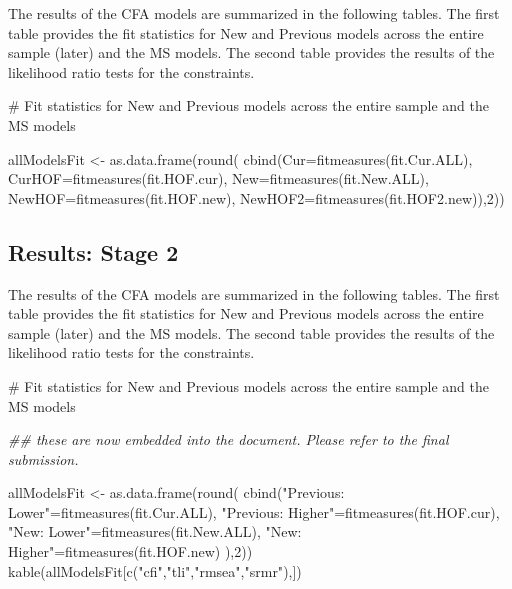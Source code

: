 \documentclass[
  letterpaper,
  DIV=11,
  numbers=noendperiod]{scrartcl}
\newenvironment{Shaded}{\begin{snugshade}}{\end{snugshade}}
\newcommand{\AttributeTok}[1]{\textcolor[rgb]{0.40,0.45,0.13}{#1}}
\newcommand{\CommentTok}[1]{\textcolor[rgb]{0.37,0.37,0.37}{#1}}
\newcommand{\DecValTok}[1]{\textcolor[rgb]{0.68,0.00,0.00}{#1}}
\newcommand{\DocumentationTok}[1]{\textcolor[rgb]{0.37,0.37,0.37}{\textit{#1}}}
\newcommand{\FunctionTok}[1]{\textcolor[rgb]{0.28,0.35,0.67}{#1}}
\newcommand{\NormalTok}[1]{\textcolor[rgb]{0.00,0.23,0.31}{#1}}
\newcommand{\OtherTok}[1]{\textcolor[rgb]{0.00,0.23,0.31}{#1}}
\newcommand{\StringTok}[1]{\textcolor[rgb]{0.13,0.47,0.30}{#1}}
\begin{document}
The results of the CFA models are summarized in the following tables.
The first table provides the fit statistics for New and Previous models
across the entire sample (later) and the MS models. The second table
provides the results of the likelihood ratio tests for the constraints.

\begin{Shaded}
\begin{Highlighting}[]
\CommentTok{\# Fit statistics for New and Previous models across the entire sample and the MS models}

\NormalTok{allModelsFit }\OtherTok{\textless{}{-}} \FunctionTok{as.data.frame}\NormalTok{(}\FunctionTok{round}\NormalTok{(}
  \FunctionTok{cbind}\NormalTok{(}\AttributeTok{Cur=}\FunctionTok{fitmeasures}\NormalTok{(fit.Cur.ALL),}
        \AttributeTok{CurHOF=}\FunctionTok{fitmeasures}\NormalTok{(fit.HOF.cur),}
        \AttributeTok{New=}\FunctionTok{fitmeasures}\NormalTok{(fit.New.ALL),}
        \AttributeTok{NewHOF=}\FunctionTok{fitmeasures}\NormalTok{(fit.HOF.new),}
        \AttributeTok{NewHOF2=}\FunctionTok{fitmeasures}\NormalTok{(fit.HOF2.new)),}\DecValTok{2}\NormalTok{))}
\end{Highlighting}
\end{Shaded}

\subsection{Results: Stage 2}\label{results-stage-2}

The results of the CFA models are summarized in the following tables.
The first table provides the fit statistics for New and Previous models
across the entire sample (later) and the MS models. The second table
provides the results of the likelihood ratio tests for the constraints.

\begin{Shaded}
\begin{Highlighting}[]
\CommentTok{\# Fit statistics for New and Previous models across the entire sample and the MS models}

\DocumentationTok{\#\# these are now embedded into the document.  Please refer to the final submission.}

\NormalTok{allModelsFit }\OtherTok{\textless{}{-}} \FunctionTok{as.data.frame}\NormalTok{(}\FunctionTok{round}\NormalTok{(}
  \FunctionTok{cbind}\NormalTok{(}\StringTok{"Previous: Lower"}\OtherTok{=}\FunctionTok{fitmeasures}\NormalTok{(fit.Cur.ALL),}
        \StringTok{"Previous: Higher"}\OtherTok{=}\FunctionTok{fitmeasures}\NormalTok{(fit.HOF.cur),}
        \StringTok{"New: Lower"}\OtherTok{=}\FunctionTok{fitmeasures}\NormalTok{(fit.New.ALL),}
        \StringTok{"New: Higher"}\OtherTok{=}\FunctionTok{fitmeasures}\NormalTok{(fit.HOF.new)}
\NormalTok{        ),}\DecValTok{2}\NormalTok{))}
\FunctionTok{kable}\NormalTok{(allModelsFit[}\FunctionTok{c}\NormalTok{(}\StringTok{"cfi"}\NormalTok{,}\StringTok{"tli"}\NormalTok{,}\StringTok{"rmsea"}\NormalTok{,}\StringTok{"srmr"}\NormalTok{),])}
\end{Highlighting}
\end{Shaded}
\end{document}
